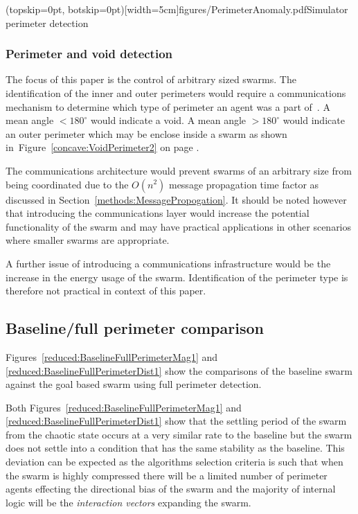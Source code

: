 \documentclass{ieeeaccess}
\begin{document}
\Figure[t!](topskip=0pt, botskip=0pt)[width=5cm]{figures/PerimeterAnomaly.pdf}{Simulator perimeter detection\label{reduced:PerimeterAnomaly}}

\subsubsection{Perimeter and void detection}\label{sec:PerimeterVoidDetection} 
The focus of this paper is the control of arbitrary sized swarms. The identification of the inner and outer perimeters would require a communications mechanism to determine which type of perimeter an agent was a part of~\cite{ZAPS:07,MD:09}. A mean angle $< 180^\circ$ would indicate a void. A mean angle $> 180^\circ$ would indicate an outer perimeter which may be enclose inside a swarm as shown in~Figure~\ref{concave:VoidPerimeter2} on page \pageref{concave:VoidPerimeter2}.  

The communications architecture would prevent swarms of an arbitrary size from being coordinated due to the $O(n^{2})$ message propagation time factor as discussed in Section~\ref{methods:MessagePropogation}. It should be noted however that introducing the communications layer would increase the potential functionality of the swarm and may have practical applications in other scenarios where smaller swarms are appropriate. 

A further issue of introducing a communications infrastructure would be the increase in the energy usage of the swarm. Identification of the perimeter type is therefore not practical in context of this paper.

\subsection{Baseline/full perimeter comparison\label{section:compareBaselineFullPerimeter}}
Figures~\ref{reduced:BaselineFullPerimeterMag1} and \ref{reduced:BaselineFullPerimeterDist1} show the comparisons of the baseline swarm against the goal based swarm using full perimeter detection. 

Both Figures~\ref{reduced:BaselineFullPerimeterMag1} and \ref{reduced:BaselineFullPerimeterDist1} show that the settling period of the swarm from the chaotic state occurs at a very similar rate to the baseline but the swarm does not settle into a condition that has the same stability as the baseline. This deviation can be expected as the algorithms selection criteria is such that when the swarm is highly compressed there will be a limited number of perimeter agents effecting the directional bias of the swarm and the majority of internal logic will be the \textit{interaction vectors} expanding the swarm.
\end{document}
